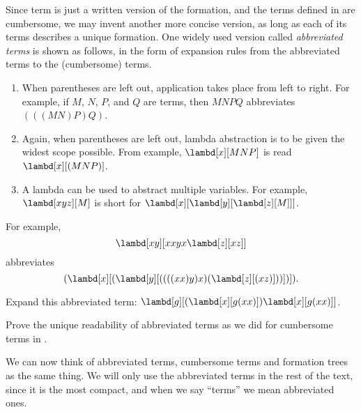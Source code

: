 \documentclass[../../../include/open-logic-section]{subfiles}
\begin{document}

Since term is just a written version of the formation, and the terms
defined in  are cumbersome, we may invent another more concise version, as
long as each of its terms describes a unique formation. One
widely used version called \emph{abbreviated terms} is shown as
follows, in the form of expansion rules from the abbreviated terms to the (cumbersome) terms.

\begin{enumerate}
\item When parentheses are left out, application takes place from left
  to right. For example, if $M$, $N$, $P$, and $Q$ are terms, then
  $MNPQ$ abbreviates $(((MN)P)Q)$.
\item Again, when parentheses are left out, lambda abstraction is to
  be given the widest scope possible. From example, $\lambd[x][MNP]$ is
  read $\lambd[x][(MNP)]$.
\item A lambda can be used to abstract multiple variables. For
  example, $\lambd[xyz][M]$ is short for
  $\lambd[x][\lambd[y][\lambd[z][M]]]$.
\end{enumerate}

For example,
\[
\lambd[xy][xxyx \lambd[z][xz]]
\]
abbreviates
\[
(\lambd[x][(\lambd[y][((((xx)y)x)(\lambd[z][(xz)]))])]).
\]

\begin{prob}
  Expand this abbreviated term: $\lambd[g][(\lambd[x][g (x x)]) \lambd[x][g (x x)]]$.
\end{prob}

\begin{prob}
  Prove the unique readability of abbreviated terms as we did for
  cumbersome terms in .
\end{prob}

We can now think of abbreviated terms, cumbersome terms and
formation trees as the same
thing. We will only use the abbreviated terms in the rest of the
text, since it is the most compact, and when we say ``terms'' we mean
abbreviated ones.
\end{document}
